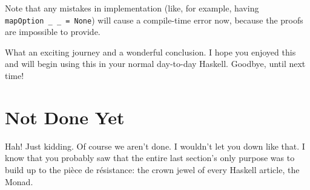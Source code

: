 \documentclass[]{article}
\begin{document}
Note that any mistakes in implementation (like, for example, having
\texttt{mapOption\ \_\ \_\ =\ None}) will cause a compile-time error now,
because the proofs are impossible to provide.

What an exciting journey and a wonderful conclusion. I hope you enjoyed this and
will begin using this in your normal day-to-day Haskell. Goodbye, until next
time!

\section{Not Done Yet}\label{not-done-yet}

Hah! Just kidding. Of course we aren't done. I wouldn't let you down like that.
I know that you probably saw that the entire last section's only purpose was to
build up to the pièce de résistance: the crown jewel of every Haskell article,
the Monad.
\end{document}

